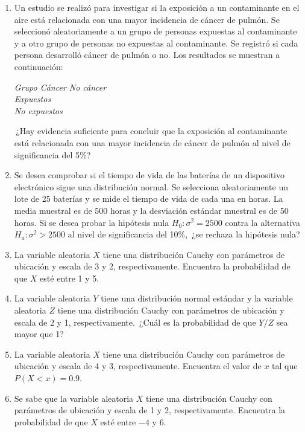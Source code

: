 \begin{Ejer}
\begin{enumerate}
\item Un estudio se realiz\'o para investigar si la exposici\'on a un contaminante en el aire est\'a relacionada con una mayor incidencia de c\'ancer de pulm\'on. Se seleccion\'o aleatoriamente a un grupo de personas expuestas al contaminante y a otro grupo de personas no expuestas al contaminante. Se registr\'o si cada persona desarroll\'o c\'ancer de pulm\'on o no. Los resultados se muestran a continuaci\'on:

\textit{Grupo \quad C\'ancer \quad No c\'ancer} \\
\textit{Expuestos  } \\
\textit{No expuestos  }

\,¿Hay evidencia suficiente para concluir que la exposici\'on al contaminante est\'a relacionada con una mayor incidencia de c\'ancer de pulm\'on al nivel de significancia del 5\%?

\item Se desea comprobar si el tiempo de vida de las bater\'ias de un dispositivo electr\'onico sigue una distribuci\'on normal. Se selecciona aleatoriamente un lote de 25 bater\'ias y se mide el tiempo de vida de cada una en horas. La media muestral es de 500 horas y la desviaci\'on est\'andar muestral es de 50 horas. Si se desea probar la hip\'otesis nula $H_0:\sigma^2=2500$ contra la alternativa $H_a:\sigma^2>2500$ al nivel de significancia del 10\%, \,¿se rechaza la hip\'otesis nula?

\item La variable aleatoria $X$ tiene una distribuci\'on Cauchy con par\'ametros de ubicaci\'on y escala de 3 y 2, respectivamente. Encuentra la probabilidad de que $X$ est\'e entre 1 y 5.

\item La variable aleatoria $Y$ tiene una distribuci\'on normal est\'andar y la variable aleatoria $Z$ tiene una distribuci\'on Cauchy con par\'ametros de ubicaci\'on y escala de 2 y 1, respectivamente. \,¿Cu\'al es la probabilidad de que $Y/Z$ sea mayor que 1?

\item La variable aleatoria $X$ tiene una distribuci\'on Cauchy con par\'ametros de ubicaci\'on y escala de 4 y 3, respectivamente. Encuentra el valor de $x$ tal que $P(X<x)=0.9$.

\item Se sabe que la variable aleatoria $X$ tiene una distribuci\'on Cauchy con par\'ametros de ubicaci\'on y escala de 1 y 2, respectivamente. Encuentra la probabilidad de que $X$ est\'e entre $-4$ y $6$.


\end{enumerate}
\end{Ejer}
